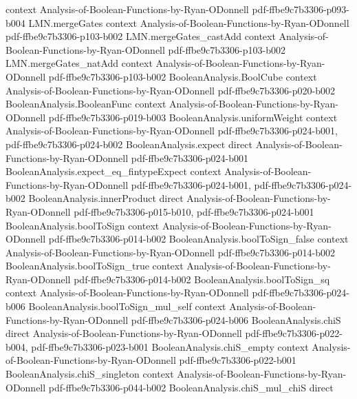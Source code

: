 \begin{lemma}
  {context}
  {Analysis-of-Boolean-Functions-by-Ryan-ODonnell}
  {pdf-ffbe9c7b3306-p093-b004}
\proofstep
  {LMN.mergeGates}
  {context}
  {Analysis-of-Boolean-Functions-by-Ryan-ODonnell}
  {pdf-ffbe9c7b3306-p103-b002}
\proofstep
  {LMN.mergeGates_castAdd}
  {context}
  {Analysis-of-Boolean-Functions-by-Ryan-ODonnell}
  {pdf-ffbe9c7b3306-p103-b002}
\proofstep
  {LMN.mergeGates_natAdd}
  {context}
  {Analysis-of-Boolean-Functions-by-Ryan-ODonnell}
  {pdf-ffbe9c7b3306-p103-b002}
\proofstep
  {BooleanAnalysis.BoolCube}
  {context}
  {Analysis-of-Boolean-Functions-by-Ryan-ODonnell}
  {pdf-ffbe9c7b3306-p020-b002}
\proofstep
  {BooleanAnalysis.BooleanFunc}
  {context}
  {Analysis-of-Boolean-Functions-by-Ryan-ODonnell}
  {pdf-ffbe9c7b3306-p019-b003}
\proofstep
  {BooleanAnalysis.uniformWeight}
  {context}
  {Analysis-of-Boolean-Functions-by-Ryan-ODonnell}
  {pdf-ffbe9c7b3306-p024-b001,
    pdf-ffbe9c7b3306-p024-b002}
\proofstep
  {BooleanAnalysis.expect}
  {direct}
  {Analysis-of-Boolean-Functions-by-Ryan-ODonnell}
  {pdf-ffbe9c7b3306-p024-b001}
\proofstep
  {BooleanAnalysis.expect_eq_fintypeExpect}
  {context}
  {Analysis-of-Boolean-Functions-by-Ryan-ODonnell}
  {pdf-ffbe9c7b3306-p024-b001,
    pdf-ffbe9c7b3306-p024-b002}
\proofstep
  {BooleanAnalysis.innerProduct}
  {direct}
  {Analysis-of-Boolean-Functions-by-Ryan-ODonnell}
  {pdf-ffbe9c7b3306-p015-b010,
    pdf-ffbe9c7b3306-p024-b001}
\proofstep
  {BooleanAnalysis.boolToSign}
  {context}
  {Analysis-of-Boolean-Functions-by-Ryan-ODonnell}
  {pdf-ffbe9c7b3306-p014-b002}
\proofstep
  {BooleanAnalysis.boolToSign_false}
  {context}
  {Analysis-of-Boolean-Functions-by-Ryan-ODonnell}
  {pdf-ffbe9c7b3306-p014-b002}
\proofstep
  {BooleanAnalysis.boolToSign_true}
  {context}
  {Analysis-of-Boolean-Functions-by-Ryan-ODonnell}
  {pdf-ffbe9c7b3306-p014-b002}
\proofstep
  {BooleanAnalysis.boolToSign_sq}
  {context}
  {Analysis-of-Boolean-Functions-by-Ryan-ODonnell}
  {pdf-ffbe9c7b3306-p024-b006}
\proofstep
  {BooleanAnalysis.boolToSign_mul_self}
  {context}
  {Analysis-of-Boolean-Functions-by-Ryan-ODonnell}
  {pdf-ffbe9c7b3306-p024-b006}
\proofstep
  {BooleanAnalysis.chiS}
  {direct}
  {Analysis-of-Boolean-Functions-by-Ryan-ODonnell}
  {pdf-ffbe9c7b3306-p022-b004,
    pdf-ffbe9c7b3306-p023-b001}
\proofstep
  {BooleanAnalysis.chiS_empty}
  {context}
  {Analysis-of-Boolean-Functions-by-Ryan-ODonnell}
  {pdf-ffbe9c7b3306-p022-b001}
\proofstep
  {BooleanAnalysis.chiS_singleton}
  {context}
  {Analysis-of-Boolean-Functions-by-Ryan-ODonnell}
  {pdf-ffbe9c7b3306-p044-b002}
\proofstep
  {BooleanAnalysis.chiS_mul_chiS}
  {direct}

\end{lemma}
